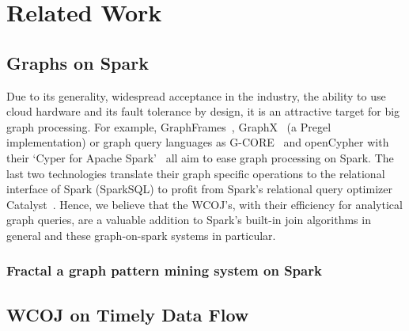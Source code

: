 \section{Related Work} \label{sec:related-work}


\subsection{Graphs on Spark}
Due to its generality, widespread acceptance in the industry, the ability to use cloud hardware and its fault tolerance by design, it is an attractive target for big graph processing.
For example, GraphFrames~\cite{graphframe}, GraphX~\cite{graphx} (a Pregel~\cite{pregel} implementation) or graph query languages as \mbox{G-CORE}~\cite{gcore} and \mbox{openCypher} with their `Cyper for Apache Spark'~\cite{caps} all aim to ease graph processing on Spark.
The last two technologies translate their graph specific operations to the relational interface of Spark (SparkSQL) to profit from Spark's relational query optimizer Catalyst~\cite{spark-sql}.
Hence, we believe that the WCOJ's, with their efficiency for analytical graph queries, are a valuable addition to Spark's built-in join algorithms in general and these graph-on-spark systems in particular.


\subsubsection{Fractal a graph pattern mining system on Spark}

\subsection{\textsc{WCOJ} on Timely Data Flow}\label{subsec:wcoj-timely-data-flow}

